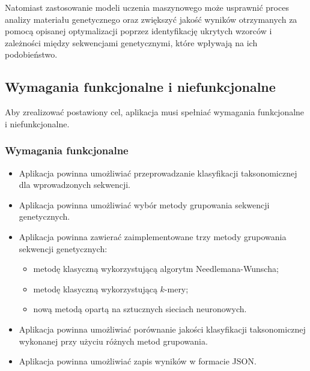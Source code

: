         Natomiast zastosowanie modeli uczenia maszynowego może usprawnić proces analizy materiału genetycznego oraz zwiększyć jakość wyników otrzymanych za pomocą opisanej optymalizacji poprzez identyfikację ukrytych wzorców i zależności między sekwencjami genetycznymi, które wpływają na ich podobieństwo.


    \subsection{Wymagania funkcjonalne i niefunkcjonalne}

    Aby zrealizować postawiony cel, aplikacja musi spełniać wymagania funkcjonalne i niefunkcjonalne.

        \subsubsection{Wymagania funkcjonalne}

            \begin{itemize}
                \item Aplikacja powinna umożliwiać przeprowadzanie klasyfikacji taksonomicznej dla wprowadzonych sekwencji.
                \item Aplikacja powinna umożliwiać wybór metody grupowania sekwencji genetycznych.
                \item {
                    Aplikacja powinna zawierać zaimplementowane trzy metody grupowania sekwencji genetycznych:
                    \begin{itemize}
                        \item {
                            metodę klasyczną wykorzystującą algorytm Needlemana-Wunscha;
                        }
                        \item {
                            metodę klasyczną wykorzystującą $k$-mery;
                        }
                        \item {
                            nową metodą opartą na sztucznych sieciach neuronowych.
                        }
                    \end{itemize}
                }
                \item Aplikacja powinna umożliwiać porównanie jakości klasyfikacji taksonomicznej wykonanej przy użyciu różnych metod grupowania.
                \item Aplikacja powinna umożliwiać zapis wyników w formacie JSON.
            \end{itemize}

